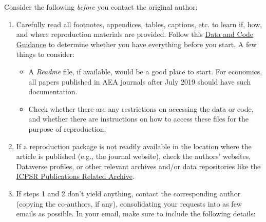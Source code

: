 \documentclass[]{book}
\providecommand{\tightlist}{%
  \setlength{\itemsep}{0pt}\setlength{\parskip}{0pt}}
\begin{document}
Consider the following \emph{before} you contact the original author:

\begin{enumerate}
\def\labelenumi{\arabic{enumi}.}
\item
  Carefully read all footnotes, appendices, tables, captions, etc. to learn if, how, and where reproduction materials are provided. Follow this \href{https://social-science-data-editors.github.io/guidance/Verification_guidance.html}{Data and Code Guidance} to determine whether you have everything before you start. A few things to consider:

  \begin{itemize}
  \tightlist
  \item
    A \emph{Readme} file, if available, would be a good place to start. For economics, all papers published in AEA journals after July 2019 should have such documentation.\\
  \item
    Check whether there are any restrictions on accessing the data or code, and whether there are instructions on how to access these files for the purpose of reproduction.
  \end{itemize}
\item
  If a reproduction package is not readily available in the location where the article is published (e.g., the journal website), check the authors' websites, Dataverse profiles, or other relevant archives and/or data repositories like the \href{https://www.icpsr.umich.edu/icpsrweb/}{ICPSR Publications Related Archive}.
\item
  If steps 1 and 2 don't yield anything, contact the corresponding author (copying the co-authors, if any), consolidating your requests into as few emails as possible. In your email, make sure to include the following details:


\end{enumerate}
\end{document}
